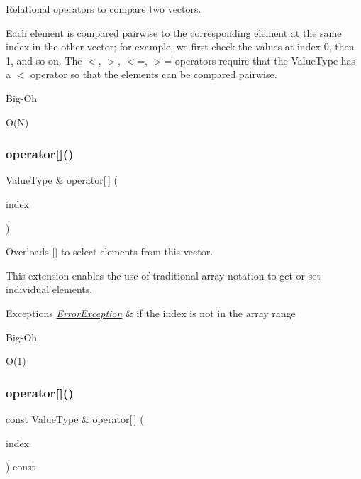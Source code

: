 Relational operators to compare two vectors. 

Each element is compared pairwise to the corresponding element at the same index in the other vector; for example, we first check the values at index 0, then 1, and so on. The $<$, $>$, $<$=, $>$= operators require that the Value\+Type has a $<$ operator so that the elements can be compared pairwise. \begin{DoxyRefDesc}{Big-\/\+Oh}
\item[\mbox{\hyperlink{BigOh__BigOh000151}{Big-\/\+Oh}}]O(\+N) \end{DoxyRefDesc}
\mbox{\label{classVector_a7dbb3a92c8b6a08a04b564aed136b870}} 
\subsubsection{\texorpdfstring{operator[]()}{operator[]()}\hspace{0.1cm}{\footnotesize\ttfamily [1/2]}}
{\footnotesize\ttfamily Value\+Type \& operator\mbox{[}$\,$\mbox{]} (\begin{DoxyParamCaption}\item[{int}]{index }\end{DoxyParamCaption})}



Overloads {\ttfamily \mbox{[}\mbox{]}} to select elements from this vector. 

This extension enables the use of traditional array notation to get or set individual elements. 
\begin{DoxyExceptions}{Exceptions}
{\em \mbox{\hyperlink{classErrorException}{Error\+Exception}}} & if the index is not in the array range \\
\hline
\end{DoxyExceptions}
\begin{DoxyRefDesc}{Big-\/\+Oh}
\item[\mbox{\hyperlink{BigOh__BigOh000139}{Big-\/\+Oh}}]O(1) \end{DoxyRefDesc}
\mbox{\label{classVector_a1b5a4ea461655cbe512ab976aad8d809}} 
\subsubsection{\texorpdfstring{operator[]()}{operator[]()}\hspace{0.1cm}{\footnotesize\ttfamily [2/2]}}
{\footnotesize\ttfamily const Value\+Type \& operator\mbox{[}$\,$\mbox{]} (\begin{DoxyParamCaption}\item[{int}]{index }\end{DoxyParamCaption}) const}




